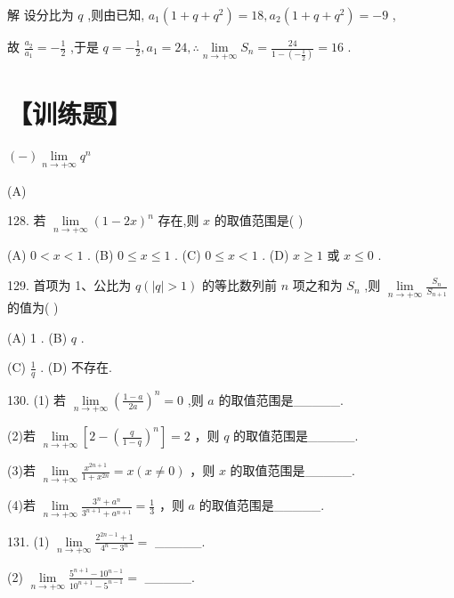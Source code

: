\documentclass[10pt]{article}
\begin{document}
解 设分比为 \(q\) ,则由已知, \({a}_{1}\left( {1 + q + {q}^{2}}\right)  = {18},{a}_{2}\left( {1 + q + {q}^{2}}\right)  =  - 9\) ,

故 \(\frac{{a}_{2}}{{a}_{1}} =  - \frac{1}{2}\) ,于是 \(q =  - \frac{1}{2},{a}_{1} = {24},\therefore \mathop{\lim }\limits_{{n \rightarrow   + \infty }}{S}_{n} = \frac{24}{1 - \left( {-\frac{1}{2}}\right) } = {16}\) .

\section*{【训练题】}

\(\left( -\right) \mathop{\lim }\limits_{{n \rightarrow   + \infty }}{q}^{n}\)

(A)

128. 若 \(\mathop{\lim }\limits_{{n \rightarrow   + \infty }}{\left( 1 - 2x\right) }^{n}\) 存在,则 \(x\) 的取值范围是( )

(A) \(0 < x < 1\) . (B) \(0 \leq  x \leq  1\) . (C) \(0 \leq  x < 1\) . (D) \(x \geq  1\) 或 \(x \leq  0\) .

129. 首项为 1、公比为 \(q\left( {\left| q\right|  > 1}\right)\) 的等比数列前 \(n\) 项之和为 \({S}_{n}\) ,则 \(\mathop{\lim }\limits_{{n \rightarrow   + \infty }}\frac{{S}_{n}}{{S}_{n + 1}}\) 的值为( )

(A) 1 . (B) \(q\) .

(C) \(\frac{1}{q}\) . (D) 不存在.

130. (1) 若 \(\mathop{\lim }\limits_{{n \rightarrow   + \infty }}{\left( \frac{1 - a}{2a}\right) }^{n} = 0\) ,则 \(a\) 的取值范围是\_\_\_\_\_.

(2)若 \(\mathop{\lim }\limits_{{n \rightarrow   + \infty }}\left\lbrack  {2 - {\left( \frac{q}{1 - q}\right) }^{n}}\right\rbrack   = 2\) ，则 \(q\) 的取值范围是\_\_\_\_\_.

(3)若 \(\mathop{\lim }\limits_{{n \rightarrow   + \infty }}\frac{{x}^{{2n} + 1}}{1 + {x}^{2n}} = x\left( {x \neq  0}\right)\) ，则 \(x\) 的取值范围是\_\_\_\_\_.

(4)若 \(\mathop{\lim }\limits_{{n \rightarrow   + \infty }}\frac{{3}^{n} + {a}^{n}}{{3}^{n + 1} + {a}^{n + 1}} = \frac{1}{3}\) ，则 \(a\) 的取值范围是\_\_\_\_\_.

131. (1) \(\mathop{\lim }\limits_{{n \rightarrow   + \infty }}\frac{{2}^{{2n} - 1} + 1}{{4}^{n} - {3}^{n}} =\) \_\_\_\_\_.

(2) \(\mathop{\lim }\limits_{{n \rightarrow   + \infty }}\frac{{5}^{n + 1} - {10}^{n - 1}}{{10}^{n + 1} - {5}^{n - 1}} =\) \_\_\_\_\_.
\end{document}
